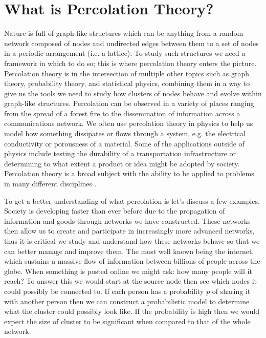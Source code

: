 \section{What is Percolation Theory?}
Nature is full of graph-like structures which can be anything from a random network composed of nodes and undirected edges between them to a set of nodes in a periodic arrangement (i.e. a lattice).
To study such structures we need a framework in which to do so; this is where percolation theory enters the picture.
Percolation theory is in the intersection of multiple other topics such as graph theory, probability theory, and statistical physics, combining them in a way to give us the tools we need to study how clusters of nodes behave and evolve within graph-like structures.
Percolation can be observed in a variety of places ranging from the spread of a forest fire to the dissemination of information across a communications network.
We often use percolation theory in physics to help us model how something dissipates or flows through a system, e.g. the electrical conductivity or porousness of a material.
Some of the applications outside of physics include testing the durability of a transportation infrastructure or determining to what extent a product or idea might be adopted by society.
Percolation theory is a broad subject with the ability to be applied to problems in many different disciplines \cite{intro_to_percolation_theory} \cite{applications_of_percolation_theory}.

To get a better understanding of what percolation is let's discuss a few examples.
Society is developing faster than ever before due to the propagation of information and goods through networks we have constructed.
These networks then allow us to create and participate in increasingly more advanced networks, thus it is critical we study and understand how these networks behave so that we can better manage and improve them.
The most well known being the internet, which sustains a massive flow of information between billions of people across the globe.
When something is posted online we might ask: how many people will it reach?
To answer this we would start at the source node then see which nodes it could possibly be connected to.
If each person has a probability $p$ of sharing it with another person then we can construct a probabilistic model to determine what the cluster could possibly look like.
If the probability is high then we would expect the size of cluster to be significant when compared to that of the whole network.

